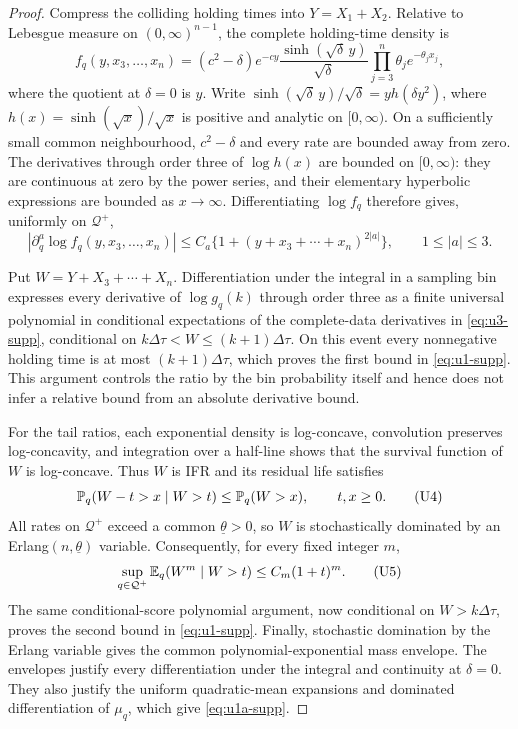 \begin{proof}
Compress the colliding holding times into \(Y=X_1+X_2\).  Relative to
Lebesgue measure on \((0,\infty)^{n-1}\), the complete holding-time density is
\[
 f_q(y,x_3,\ldots,x_n)
 =(c^2-\delta)e^{-cy}\frac{\sinh(\sqrt\delta\,y)}{\sqrt\delta}
 \prod_{j=3}^n\theta_j e^{-\theta_jx_j},
\tag{U2}\label{eq:u2-supp}
\]
where the quotient at \(\delta=0\) is \(y\).  Write
\(\sinh(\sqrt\delta\,y)/\sqrt\delta=y h(\delta y^2)\), where
\(h(x)=\sinh(\sqrt x)/\sqrt x\) is positive and analytic on
\([0,\infty)\).  On a sufficiently small common neighbourhood,
\(c^2-\delta\) and every rate are bounded away from zero.  The derivatives
through order three of \(\log h(x)\) are bounded on \([0,\infty)\): they are
continuous at zero by the power series, and their elementary hyperbolic
expressions are bounded as \(x\to\infty\).  Differentiating \(\log f_q\)
therefore gives, uniformly on \(\mathcal Q^+\),
\[
 |\partial_q^a\log f_q(y,x_3,\ldots,x_n)|
 \le C_a\{1+(y+x_3+\cdots+x_n)^{2|a|}\},
 \qquad 1\le |a|\le3.
\tag{U3}\label{eq:u3-supp}
\]

Put \(W=Y+X_3+\cdots+X_n\).  Differentiation under the integral in a
sampling bin expresses every derivative of \(\log g_q(k)\) through order
three as a finite universal polynomial in conditional expectations of the
complete-data derivatives in \eqref{eq:u3-supp}, conditional on
\(k\Delta\tau<W\le(k+1)\Delta\tau\).  On this event every nonnegative
holding time is at most \((k+1)\Delta\tau\), which proves the first bound in
\eqref{eq:u1-supp}.  This argument controls the ratio by the bin probability
itself and hence does not infer a relative bound from an absolute derivative
bound.

For the tail ratios, each exponential density is log-concave, convolution
preserves log-concavity, and integration over a half-line shows that the
survival function of \(W\) is log-concave.  Thus \(W\) is IFR and its residual
life satisfies
\[
 \mathbb P_q(W-t>x\mid W>t)\le \mathbb P_q(W>x),\qquad t,x\ge0.
\tag{U4}\label{eq:u4-supp}
\]
All rates on \(\mathcal Q^+\) exceed a common \(\underline\theta>0\), so
\(W\) is stochastically dominated by an
Erlang\((n,\underline\theta)\) variable.  Consequently, for every fixed
integer \(m\),
\[
 \sup_{q\in\mathcal Q^+}\mathbb E_q(W^m\mid W>t)
 \le C_m(1+t)^m.
\tag{U5}\label{eq:u5-supp}
\]
The same conditional-score polynomial argument, now conditional on
\(W>k\Delta\tau\), proves the second bound in \eqref{eq:u1-supp}.  Finally,
stochastic domination by the Erlang variable gives the common
polynomial-exponential mass envelope.  The envelopes justify every
differentiation under the integral and continuity at \(\delta=0\).
They also justify the uniform quadratic-mean expansions and dominated
differentiation of \(\mu_q\), which give \eqref{eq:u1a-supp}.
\end{proof}

